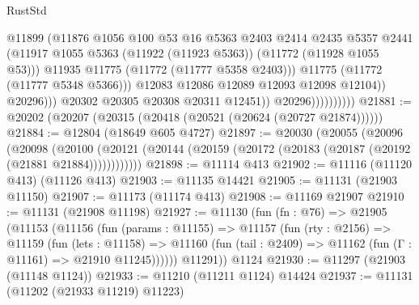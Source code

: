 \begin{lexlean}{RustStd}
\begin{coremodule}
                                        @11899
                                        (@11876
                                          @1056
                                          @100
                                          @53
                                          @16
                                          @5363
                                          @2403
                                          @2414
                                          @2435
                                          @5357
                                          @2441
                                          (@11917
                                            @1055
                                            @5363
                                            (@11922 (@11923 @5363))
                                            (@11772 (@11928 @1055 @53)))
                                          @11935
                                          @11775
                                          (@11772 (@11777 @5358 @2403)))
                                        @11775
                                        (@11772 (@11777 @5348 @5366)))
                                      @12083
                                      @12086
                                      @12089
                                      @12093
                                      @12098
                                      @12104))
                                  @20296)))
                            @20302
                            @20305
                            @20308
                            @20311
                            @12451))
                        @20296))))))))))
@21881 := @20202 (@20207 (@20315 (@20418 (@20521 (@20624 (@20727 @21874))))))
@21884 := @12804 (@18649 @605 @4727)
@21897 := @20030
    (@20055
      (@20096
        (@20098
          (@20100 (@20121 (@20144 (@20159 (@20172 (@20183 (@20187 (@20192 (@21881 @21884))))))))))))
@21898 := @11114 @413
@21902 := @11116 (@11120 @413) (@11126 @413)
@21903 := @11135 @14421
@21905 := @11131 (@21903 @11150)
@21907 := @11173 (@11174 @413)
@21908 := @11169 @21907
@21910 := @11131 (@21908 @11198)
@21927 := @11130
    (fun (fn : @76) =>
    @21905
      (@11153
        (@11156
          (fun (params : @11155) =>
          @11157
            (fun (rty : @2156) =>
            @11159
              (fun (lets : @11158) =>
              @11160 (fun (tail : @2409) => @11162 (fun (Γ : @11161) => @21910 @11245))))))
        @11291))
    @1124
@21930 := @11297 (@21903 (@11148 @1124))
@21933 := @11210 (@11211 @1124) @14424
@21937 := @11131 (@11202 (@21933 @11219) @11223)

\end{coremodule}
\end{lexlean}
